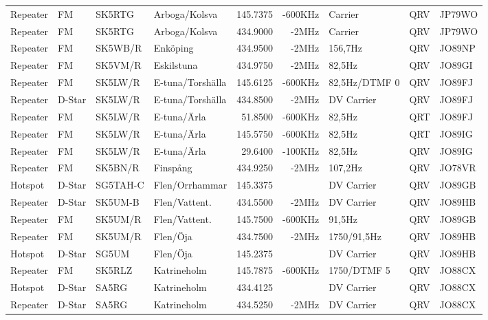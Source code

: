 \begin{landscape}
\begin{longtable}{llllrrlcl}
Repeater & FM     & SK5RTG   & Arboga/Kolsva     & 145.7375 & -600KHz & Carrier       & QRV  & JP79WO \\
Repeater & FM     & SK5RTG   & Arboga/Kolsva     & 434.9000 & -2MHz   & Carrier       & QRV  & JP79WO \\
Repeater & FM     & SK5WB/R  & Enköping          & 434.9500 & -2MHz   & 156,7Hz       & QRV  & JO89NP \\
Repeater & FM     & SK5VM/R  & Eskilstuna        & 434.9750 & -2MHz   & 82,5Hz        & QRV  & JO89GI \\
Repeater & FM     & SK5LW/R  & E-tuna/Torshälla  & 145.6125 & -600KHz & 82,5Hz/DTMF 0 & QRV  & JO89FJ \\
Repeater & D-Star & SK5LW/R  & E-tuna/Torshälla  & 434.8500 & -2MHz   & DV Carrier    & QRV  & JO89FJ \\
Repeater & FM     & SK5LW/R  & E-tuna/Ärla       & 51.8500  & -600KHz & 82,5Hz        & QRT  & JO89FJ \\
Repeater & FM     & SK5LW/R  & E-tuna/Ärla       & 145.5750 & -600KHz & 82,5Hz        & QRT  & JO89IG \\
Repeater & FM     & SK5LW/R  & E-tuna/Ärla       & 29.6400  & -100KHz & 82,5Hz        & QRV  & JO89IG \\
Repeater & FM     & SK5BN/R  & Finspång          & 434.9250 & -2MHz   & 107,2Hz       & QRV  & JO78VR \\
Hotspot  & D-Star & SG5TAH-C & Flen/Orrhammar    & 145.3375 &         & DV Carrier    & QRV  & JO89GB \\
Repeater & D-Star & SK5UM-B  & Flen/Vattent.     & 434.5500 & -2MHz   & DV Carrier    & QRV  & JO89HB \\
Repeater & FM     & SK5UM/R  & Flen/Vattent.     & 145.7500 & -600KHz & 91,5Hz        & QRV  & JO89GB \\
Repeater & FM     & SK5UM/R  & Flen/Öja          & 434.7500 & -2MHz   & 1750/91,5Hz   & QRV  & JO89HB \\
Hotspot  & D-Star & SG5UM    & Flen/Öja          & 145.2375 &         & DV Carrier    & QRV  & JO89HB \\
Repeater & FM     & SK5RLZ   & Katrineholm       & 145.7875 & -600KHz & 1750/DTMF 5   & QRV  & JO88CX \\
Hotspot  & D-Star & SA5RG    & Katrineholm       & 434.4125 &         & DV Carrier    & QRV  & JO88CX \\
Repeater & D-Star & SA5RG    & Katrineholm       & 434.5250 & -2MHz   & DV Carrier    & QRV  & JO88CX \\

\end{longtable}
\end{landscape}
